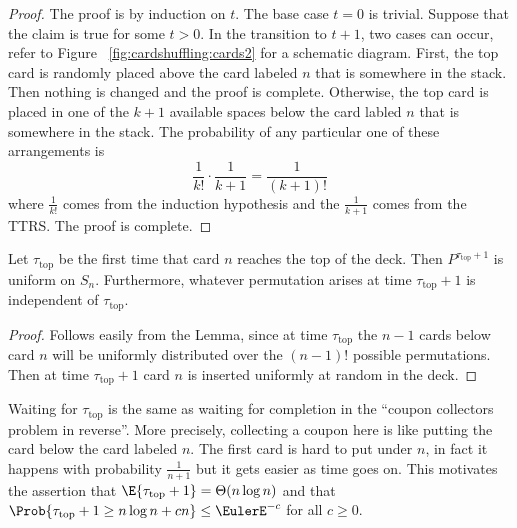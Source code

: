 \documentclass[12pt]{article}
\begin{document}
\begin{proof}
    The proof is by induction on \( t \).  The base case \( t = 0 \) is
    trivial.  Suppose that the claim is true for some \( t > 0 \).  In
    the transition to \( t + 1 \), two cases can occur, refer to Figure~%
    \ref{fig:cardshuffling:cards2} for a schematic diagram. First, the
    top card is randomly placed above the card labeled \( n \) that is
    somewhere in the stack.  Then nothing is changed and the proof is
    complete.  Otherwise, the top card is placed in one of the \( k+1 \)
    available spaces below the card labled \( n \) that is somewhere in
    the stack.  The probability of any particular one of these
    arrangements is
    \[
        \frac{1}{k!} \cdot \frac{1}{k+1} = \frac{1}{(k+1)!}
    \] where \( \frac{1}{k!} \) comes from the induction hypothesis and
    the \( \frac{1}{k+1} \) comes from the TTRS\@.  The proof is
    complete.
\end{proof}

\begin{theorem}
    Let \( \tau_{\text{top}} \) be the first time that card \( n \)
    reaches the top of the deck.  Then \( P^{\tau_{\text{top}}+1} \) is
    uniform on \( S_n \).  Furthermore, whatever permutation arises at
    time \( \tau_{\text{top}}+1 \) is independent of \( \tau_{\text{top}}
    \).
\end{theorem}

\begin{proof}
    Follows easily from the Lemma, since at time \( \tau_{\text{top}} \)
    the \( n-1 \) cards below card \( n \) will be uniformly distributed
    over the \( (n-1)! \) possible permutations.  Then at time \( \tau_{\text
    {top}}+ 1 \) card \( n \) is inserted uniformly at random in the
    deck.
\end{proof}

\begin{remark}
    Waiting for \( \tau_{\text{top}} \) is the same as waiting for
    completion in the ``coupon collectors problem in reverse''.  More
    precisely, collecting a coupon here is like putting the card below
    the card labeled \( n \).  The first card is hard to put under \( n \),
    in fact it happens with probability \( \frac{1}{n+1} \) but it gets
    easier as time goes on.  This motivates the assertion that \( \E{\tau_
    {\text{top}} + 1} = \Theta(n \log n) \) and that \( \Prob{\tau_{\text
    {top}}+1 \ge n \log n + c n} \le \EulerE^{-c} \) for all \( c \ge 0 \).
\end{remark}
\end{document}
